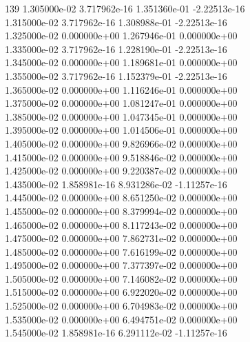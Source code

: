 139	1.305000e-02	3.717962e-16	1.351360e-01	-2.22513e-16	\\ 	1.315000e-02	3.717962e-16	1.308988e-01	-2.22513e-16	\\ 	1.325000e-02	0.000000e+00	1.267946e-01	0.000000e+00	\\ 	1.335000e-02	3.717962e-16	1.228190e-01	-2.22513e-16	\\ 	1.345000e-02	0.000000e+00	1.189681e-01	0.000000e+00	\\ 	1.355000e-02	3.717962e-16	1.152379e-01	-2.22513e-16	\\ 	1.365000e-02	0.000000e+00	1.116246e-01	0.000000e+00	\\ 	1.375000e-02	0.000000e+00	1.081247e-01	0.000000e+00	\\ 	1.385000e-02	0.000000e+00	1.047345e-01	0.000000e+00	\\ 	1.395000e-02	0.000000e+00	1.014506e-01	0.000000e+00	\\ 	1.405000e-02	0.000000e+00	9.826966e-02	0.000000e+00	\\ 	1.415000e-02	0.000000e+00	9.518846e-02	0.000000e+00	\\ 	1.425000e-02	0.000000e+00	9.220387e-02	0.000000e+00	\\ 	1.435000e-02	1.858981e-16	8.931286e-02	-1.11257e-16	\\ 	1.445000e-02	0.000000e+00	8.651250e-02	0.000000e+00	\\ 	1.455000e-02	0.000000e+00	8.379994e-02	0.000000e+00	\\ 	1.465000e-02	0.000000e+00	8.117243e-02	0.000000e+00	\\ 	1.475000e-02	0.000000e+00	7.862731e-02	0.000000e+00	\\ 	1.485000e-02	0.000000e+00	7.616199e-02	0.000000e+00	\\ 	1.495000e-02	0.000000e+00	7.377397e-02	0.000000e+00	\\ 	1.505000e-02	0.000000e+00	7.146082e-02	0.000000e+00	\\ 	1.515000e-02	0.000000e+00	6.922020e-02	0.000000e+00	\\ 	1.525000e-02	0.000000e+00	6.704983e-02	0.000000e+00	\\ 	1.535000e-02	0.000000e+00	6.494751e-02	0.000000e+00	\\ 	1.545000e-02	1.858981e-16	6.291112e-02	-1.11257e-16	\\ \hline
